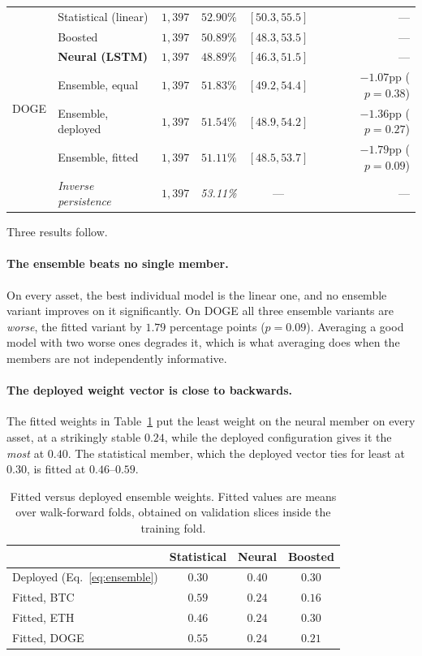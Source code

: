 \documentclass[preprint,12pt,authoryear]{elsarticle}
\begin{document}
\begin{table}[t]
\begin{tabular}{@{}llrrcr@{}}
\midrule
\multirow{7}{*}{DOGE}
 & Statistical (linear)  & $1{,}397$ & $\mathbf{52.90\%}$ & $[50.3, 55.5]$ & --- \\
 & Boosted               & $1{,}397$ & $50.89\%$ & $[48.3, 53.5]$ & --- \\
 & \textbf{Neural (LSTM)}& $1{,}397$ & $48.89\%$ & $[46.3, 51.5]$ & --- \\
 & Ensemble, equal       & $1{,}397$ & $51.83\%$ & $[49.2, 54.4]$ & $-1.07$pp ($p=0.38$) \\
 & Ensemble, deployed    & $1{,}397$ & $51.54\%$ & $[48.9, 54.2]$ & $-1.36$pp ($p=0.27$) \\
 & Ensemble, fitted      & $1{,}397$ & $51.11\%$ & $[48.5, 53.7]$ & $-1.79$pp ($p=0.09$) \\
 & \textit{Inverse persistence} & $1{,}397$ & \textit{53.11\%} & --- & --- \\
\bottomrule
\end{tabular}
\end{table}

Three results follow.

\paragraph{The ensemble beats no single member.} On every asset, the best
individual model is the linear one, and no ensemble variant improves on it
significantly. On DOGE all three ensemble variants are \emph{worse}, the fitted
variant by $1.79$ percentage points ($p = 0.09$). Averaging a good model with two
worse ones degrades it, which is what averaging does when the members are not
independently informative.

\paragraph{The deployed weight vector is close to backwards.} The fitted weights
in Table~\ref{tab:weights} put the least weight on the neural member on every
asset, at a strikingly stable $0.24$, while the deployed configuration gives it
the \emph{most} at $0.40$. The statistical member, which the deployed vector ties
for least at $0.30$, is fitted at $0.46$--$0.59$.

\begin{table}[t]\centering\small
\caption{Fitted versus deployed ensemble weights. Fitted values are means over
walk-forward folds, obtained on validation slices inside the training fold.}
\label{tab:weights}
\begin{tabular}{@{}lccc@{}}
\toprule
& Statistical & Neural & Boosted \\
\midrule
Deployed (Eq.~\ref{eq:ensemble}) & $0.30$ & $\mathbf{0.40}$ & $0.30$ \\
Fitted, BTC  & $0.59$ & $\mathbf{0.24}$ & $0.16$ \\
Fitted, ETH  & $0.46$ & $\mathbf{0.24}$ & $0.30$ \\
Fitted, DOGE & $0.55$ & $\mathbf{0.24}$ & $0.21$ \\
\bottomrule
\end{tabular}
\end{table}
\end{document}
